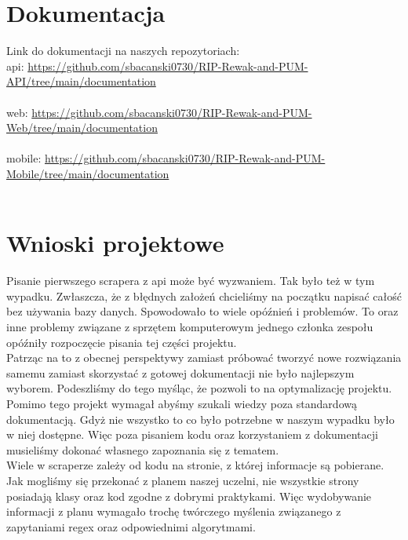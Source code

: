 \documentclass{article}
\begin{document}
\section{Dokumentacja}
Link do dokumentacji na naszych repozytoriach: \\
api: \url{https://github.com/sbacanski0730/RIP-Rewak-and-PUM-API/tree/main/documentation}\\\\
web: \url{https://github.com/sbacanski0730/RIP-Rewak-and-PUM-Web/tree/main/documentation}\\\\
mobile: \url{https://github.com/sbacanski0730/RIP-Rewak-and-PUM-Mobile/tree/main/documentation}\\\\

\section{Wnioski projektowe}

Pisanie pierwszego scrapera z api może być wyzwaniem. Tak było też w tym wypadku. Zwłaszcza, że z błędnych założeń chcieliśmy na początku napisać całość bez używania bazy danych. Spowodowało to wiele opóźnień i problemów. To oraz inne problemy związane z sprzętem komputerowym jednego członka zespołu opóźniły rozpoczęcie pisania tej części projektu.\\
Patrząc na to z obecnej perspektywy zamiast próbować tworzyć nowe rozwiązania samemu zamiast skorzystać z gotowej dokumentacji nie było najlepszym wyborem. Podeszliśmy do tego myśląc, że pozwoli to na optymalizację projektu.\\
Pomimo tego projekt wymagał abyśmy szukali wiedzy poza standardową dokumentacją. Gdyż nie wszystko to co było potrzebne w naszym wypadku było w niej dostępne. Więc poza pisaniem kodu oraz korzystaniem z dokumentacji musieliśmy dokonać własnego zapoznania się z tematem.\\
Wiele w scraperze zależy od kodu na stronie, z której informacje są pobierane. Jak mogliśmy się przekonać z planem naszej uczelni, nie wszystkie strony posiadają klasy oraz kod zgodne z dobrymi praktykami. Więc wydobywanie informacji z planu wymagało trochę twórczego myślenia związanego z zapytaniami regex oraz odpowiednimi algorytmami.
\end{document}
